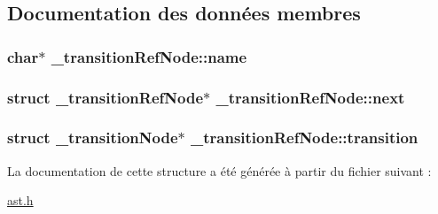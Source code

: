 \subsection{Documentation des données membres}
\hypertarget{struct__transitionRefNode_acf497e8ca37754f49fb6e5bf07316a35}{
\subsubsection[{name}]{\setlength{\rightskip}{0pt plus 5cm}char$\ast$ \-\_\-transition\-Ref\-Node\-::name}}\label{struct__transitionRefNode_acf497e8ca37754f49fb6e5bf07316a35}
\hypertarget{struct__transitionRefNode_aba5a7e049f8e3970a99d03288499085f}{
\subsubsection[{next}]{\setlength{\rightskip}{0pt plus 5cm}struct {\bf \-\_\-transition\-Ref\-Node}$\ast$ \-\_\-transition\-Ref\-Node\-::next}}\label{struct__transitionRefNode_aba5a7e049f8e3970a99d03288499085f}
\hypertarget{struct__transitionRefNode_ab9614e396cf77178d67252922c643304}{
\subsubsection[{transition}]{\setlength{\rightskip}{0pt plus 5cm}struct {\bf \-\_\-transition\-Node}$\ast$ \-\_\-transition\-Ref\-Node\-::transition}}\label{struct__transitionRefNode_ab9614e396cf77178d67252922c643304}


La documentation de cette structure a été générée à partir du fichier suivant \-:\begin{DoxyCompactItemize}
\item 
\hyperlink{ast_8h}{ast.\-h}\end{DoxyCompactItemize}
